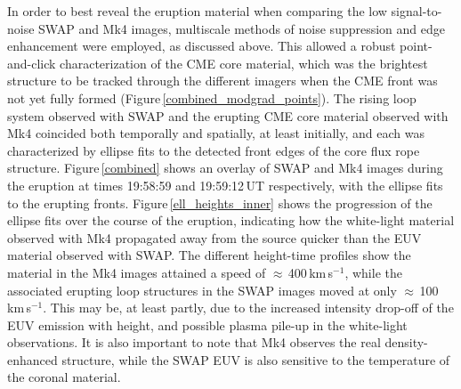 \documentclass[namedreferences]{solarphysics}
\begin{document}
\begin{article}
In order to best reveal the eruption material when comparing the low signal-to-noise SWAP and Mk4 images, multiscale methods of noise suppression and edge enhancement were employed, as discussed above. This allowed a robust point-and-click characterization of the CME core material, which was the brightest structure to be tracked through the different imagers when the CME front was not yet fully formed (Figure\,\ref{combined_modgrad_points}). The rising loop system observed with SWAP and the erupting CME core material observed with Mk4 coincided both temporally and spatially, at least initially, and each was characterized by ellipse fits to the detected front edges of the core flux rope structure. Figure\,\ref{combined} shows an overlay of SWAP and Mk4 images during the eruption at times 19:58:59 and 19:59:12\,UT respectively, with the ellipse fits to the erupting fronts. Figure\,\ref{ell_heights_inner} shows the progression of the ellipse fits over the course of the eruption, indicating how the white-light material observed with Mk4 propagated away from the source quicker than the EUV material observed with SWAP. The different height-time profiles show the material in the Mk4 images attained a speed of $\approx$\,400\,km\,s$^{-1}$, while the associated erupting loop structures in the SWAP images moved at only $\approx$\,100\,km\,s$^{-1}$. This may be, at least partly, due to the increased intensity drop-off of the EUV emission with height, and possible plasma pile-up in the white-light observations. It is also important to note that Mk4 observes the real density-enhanced structure, while the SWAP EUV is also sensitive to the temperature of the coronal material.


\end{article}
\end{document}
